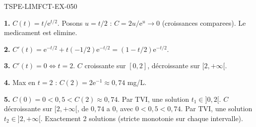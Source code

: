\begin{corrige}{TSPE-LIMFCT-EX-050}

\textbf{1.} $C(t) = t/\mathrm{e}^{t/2}$. Posons $u = t/2$ : $C = 2u/\mathrm{e}^u \to 0$ (croissances comparees). Le medicament est elimine.

\textbf{2.} $C'(t) = \mathrm{e}^{-t/2} + t(-1/2)\mathrm{e}^{-t/2} = (1-t/2)\mathrm{e}^{-t/2}$.

\textbf{3.} $C'(t) = 0 \iff t = 2$. $C$ croissante sur $[0, 2]$, décroissante sur $[2, +\infty[$.

\textbf{4.} Max en $t = 2$ : $C(2) = 2\mathrm{e}^{-1} \approx 0{,}74$ mg/L.

\textbf{5.} $C(0) = 0 < 0{,}5 < C(2) \approx 0{,}74$. Par TVI, une solution $t_1 \in ]0, 2[$. $C$ décroissante sur $[2, +\infty[$, de $0{,}74$ a $0$, avec $0 < 0{,}5 < 0{,}74$. Par TVI, une solution $t_2 \in ]2, +\infty[$. Exactement 2 solutions (stricte monotonie sur chaque intervalle).

\end{corrige}

